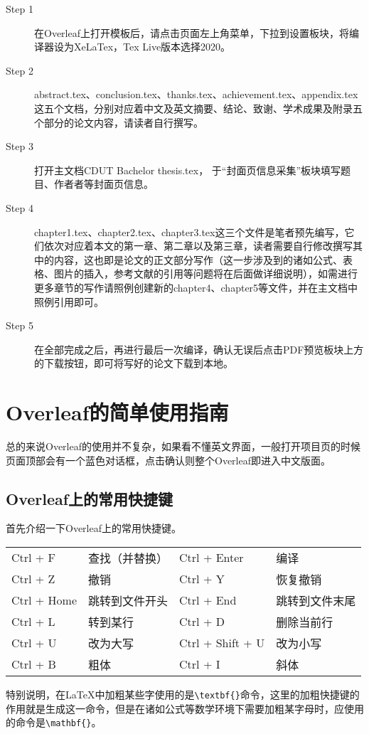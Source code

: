 \begin{description}
  \item[Step 1]  在Overleaf上打开模板后，请点击页面左上角菜单，下拉到设置板块，将编译器设为XeLaTex，Tex Live版本选择2020。
  
  \item[Step 2]  abstract.tex、conclusion.tex、thanks.tex、achievement.tex、appendix.tex这五个文档，分别对应着中文及英文摘要、结论、致谢、学术成果及附录五个部分的论文内容，请读者自行撰写。

  \item[Step 3]  打开主文档CDUT Bachelor thesis.tex， 于“封面页信息采集”板块填写题目、作者者等封面页信息。

  \item[Step 4]  chapter1.tex、chapter2.tex、chapter3.tex这三个文件是笔者预先编写，它们依次对应着本文的第一章、第二章以及第三章，读者需要自行修改撰写其中的内容，这也即是论文的正文部分写作（这一步涉及到的诸如公式、表格、图片的插入，参考文献的引用等问题将在后面做详细说明），如需进行更多章节的写作请照例创建新的chapter4、chapter5等文件，并在主文档中照例引用即可。
  
  \item[Step 5]  在全部完成之后，再进行最后一次编译，确认无误后点击PDF预览板块上方的下载按钮，即可将写好的论文下载到本地。
\end{description}

\section{Overleaf的简单使用指南}

总的来说Overleaf的使用并不复杂，如果看不懂英文界面，一般打开项目页的时候页面顶部会有一个蓝色对话框，点击确认则整个Overleaf即进入中文版面。

\subsection{Overleaf上的常用快捷键}

首先介绍一下Overleaf上的常用快捷键。

\begin{table}[ht]\centering
\begin{tabular}{l l l l}
\hline
Ctrl + F & 查找（并替换）& Ctrl + Enter & 编译 \\
Ctrl + Z & 撤销 & Ctrl + Y & 恢复撤销 \\
Ctrl + Home & 跳转到文件开头 & Ctrl + End & 跳转到文件末尾 \\
Ctrl + L & 转到某行 & Ctrl + D & 删除当前行 \\
Ctrl + U & 改为大写 & Ctrl + Shift + U & 改为小写 \\
Ctrl + B & 粗体 & Ctrl + I & 斜体 \\
\hline
\end{tabular}
\end{table}
特别说明，在LaTeX中加粗某些字使用的是\verb|\textbf{}|命令，这里的加粗快捷键的作用就是生成这一命令，但是在诸如公式等数学环境下需要加粗某字母时，应使用的命令是\verb|\mathbf{}|。

